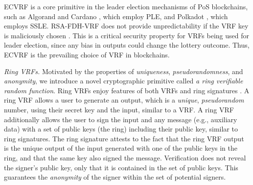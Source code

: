 ECVRF is a core primitive in the leader election mechanisms of PoS blockchains, such as Algorand \cite{ChenM19} and Cardano \cite{KiayiasRDO17,DavidGKR17}, which employ PLE, and Polkadot \cite{BurdgesASV23a}, which employs SSLE.
RSA-FDH-VRF does not provide unpredictability if the VRF key is maliciously chosen \cite{VRF-RFC}. This is a critical security property for VRFs being used for leader election, since any bias in outputs could change the lottery outcome.  Thus, ECVRF is the prevailing choice of VRF in blockchains.
%
%

\smallskip
\noindent \emph{Ring VRFs.} Motivated by the properties of \emph{uniqueness}, \emph{pseudorandomness}, and \emph{anonymity}, we introduce a novel cryptographic primitive called \emph{a ring verifiable random function}.  Ring VRFs enjoy features of both VRFs \cite{vrf_micali}  and ring signatures \cite{ring_accountable,ring_efficient,ring_linkable,ring_noRO,ring_sublinear}. A ring VRF allows a user to generate an output, which is a \emph{unique}, \emph{pseudorandom} number, using their secret key and the input, similar to a VRF.  A ring VRF additionally allows the user to sign the input and any message (e.g., auxiliary data)  with a set of public keys (the ring) including their public key, similar to ring signatures. The ring signature attests to the fact that the ring VRF output is the unique output of the input generated with one of the public keys in the ring, and that the same key also signed the message. Verification does not reveal the signer's public key, only that it is contained in the set of public keys.
This guarantees the \emph{anonymity} of the signer within the set of potential signers.

